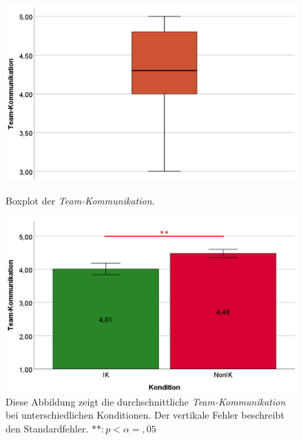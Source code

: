 \documentclass[a4paper,11pt]{article}%
\renewcommand{\\}{\vspace*{0.5\baselineskip} \newline}
\begin{document}
{	\begin{figure}[H]
   \begin{minipage}[t]{.5\linewidth} %
      \includegraphics[width=\linewidth]{Abbildungen/AuswertungDiagramme/Final/BP_Teamkommunikation.png}
      \caption[Boxplot der Team-Kommunikation]{Boxplot der \textit{Team-Kommunikation}.}
            \label{SD_TeamkommunikationBP}
   \end{minipage}
   \hspace{.02\linewidth}%
   \begin{minipage}[t]{.5\linewidth} %
     \includegraphics[width=\linewidth]{Abbildungen/AuswertungDiagramme/Final/SD_Teamkommunikation_Mittelwerte.png}
      \caption[Durchschnittliche Team-Kommunikation]{Diese Abbildung zeigt die durchschnittliche \textit{Team-Kommunikation} bei unterschiedlichen Konditionen. Der vertikale Fehler beschreibt den Standardfehler. $** : p < \alpha = ,05$}
       \label{SD_Teamkommunikation_Mittelwerte}
   \end{minipage}
\end{figure}

}
\end{document}
